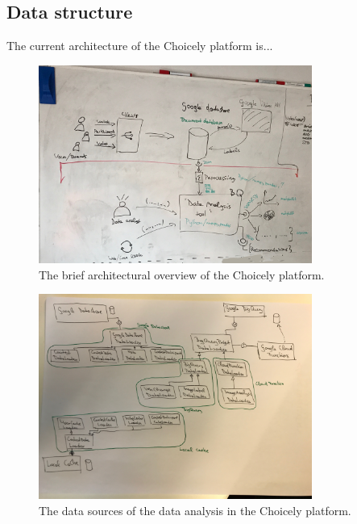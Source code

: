     \subsection{Data structure}
    The current architecture of the Choicely platform is...
    \begin{figure}[h] 
		\begin{center}
            \includegraphics[width=0.8\textwidth]{Images/architecture_whiteboard.jpg}
			\caption{The brief architectural overview of the Choicely platform.}
			\label{choicely_architecture}
		\end{center}
    \end{figure}

    \begin{figure}[h] 
		\begin{center}
            \includegraphics[width=0.8\textwidth]{Images/IMG_1317.jpg}
			\caption{The data sources of the data analysis in the Choicely platform.}
			\label{choicely_data_sources}
		\end{center}
    \end{figure}

